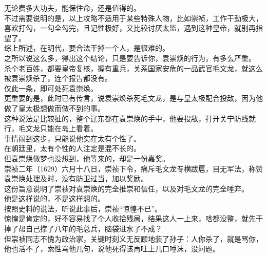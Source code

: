 \begin{multicols}{\theparacolNo}
无论费多大功夫，能保住命，还是值得的。\\

不过需要说明的是，以上攻略不适用于某些特殊人物，比如崇祯，工作干劲极大，喜欢打勾，一勾全勾完，且记性极好，又比较讨厌太监，遇到这种皇帝，就别再指望了。\\

综上所述，在明代，要合法干掉一个人，是很难的。\\

之所以说这么多，得出这个结论，只是要告诉你，袁崇焕的行为，有多么严重。\\

杀个老百姓，都要皇帝复核，握有重兵，关系国家安危的一品武官毛文龙，就这么被袁崇焕杀了，连个报告都没有。\\

仅此一条，即可处死袁崇焕。\\

更重要的是，此时已有传言，说袁崇焕杀死毛文龙，是与皇太极配合投敌，因为他做了皇太极想做而做不到的事。\\

这种说法是比较扯的，整个辽东都在袁崇焕的手中，他要投敌，打开关宁防线就行，毛文龙只能在岛上看着。\\

事情闹到这步，只能说他实在太有个性了。\\

在朝廷里，太有个性的人注定是混不长的。\\

但袁崇焕做梦也没想到，他等来的，却是一份嘉奖。\\

崇祯二年（1629）六月十八日，崇祯下令，痛斥毛文龙专横跋扈，目无军法，称赞袁崇焕处理及时，没有防卫过当，加以奖励。\\

这份旨意说明了崇祯对袁崇焕的完全推崇和信任，以及对毛文龙的完全唾弃。\\

他是这样说的，不是这样想的。\\

按照史料的说法，听说此事后，崇祯“惊惶不已”。\\

惊惶是肯定的，好不容易找了个人收拾残局，结果这人一上来，啥都没整，就先干掉了帮自己撑了八年的毛总兵，脑袋进水了不成？\\

但崇祯同志不愧为政治家，关键时刻义无反顾地装了孙子：人你杀了，就是骂你，他也活不了，索性骂他几句，说他死得该再吐上几口唾沫，没问题。\\


\end{multicols}
